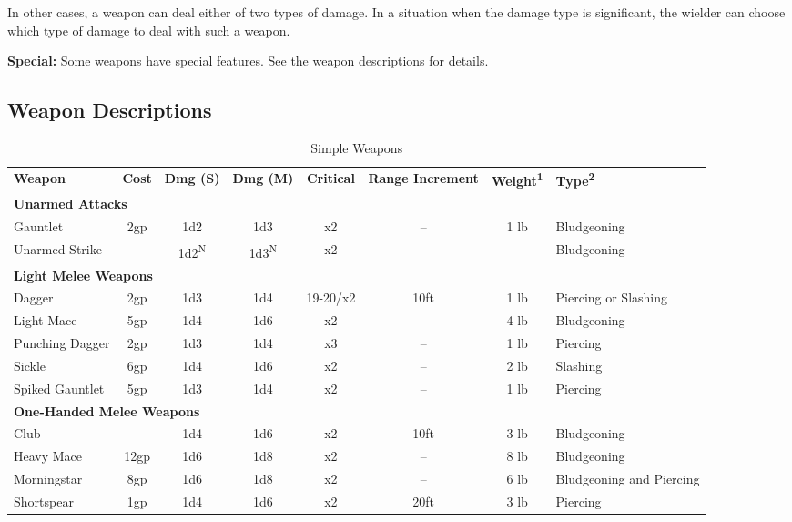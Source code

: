 In other cases, a weapon can deal either of two types of damage. In a situation 
when the damage type is significant, the wielder can choose which type of damage 
to deal with such a weapon.

\textbf{Special:} Some weapons have special features. See the weapon descriptions 
for details.

\subsection{Weapon Descriptions}

\begin{table}[htb]
\mcinherit
\caption{Simple Weapons}
\centering
\begin{tabular}{l c c c c c c p{2cm}}
\textbf{Weapon} & \textbf{Cost} & \textbf{Dmg (S)} & \textbf{Dmg (M)} & \textbf{Critical} & \multicolumn{1}{p{1.7cm}}{\raggedright{}\textbf{Range Increment}} & \textbf{Weight\textsuperscript{1}} & \textbf{Type\textsuperscript{2}}\\

\multicolumn{8}{l}{\textbf{Unarmed Attacks}}\\
\hspace{.5cm}Gauntlet & 2gp & 1d2 & 1d3 & x2 & -- & 1 lb & Bludgeoning\\
\hspace{.5cm}Unarmed Strike & -- & 1d2\textsuperscript{N} & 1d3\textsuperscript{N} & x2 & -- & -- & Bludgeoning\\

\multicolumn{8}{l}{\textbf{Light Melee Weapons}}\\
\hspace{.5cm}Dagger & 2gp & 1d3 & 1d4 & 19-20/x2 & 10ft & 1 lb & Piercing or Slashing\\
\hspace{.5cm}Light Mace & 5gp & 1d4 & 1d6 & x2 & -- & 4 lb & Bludgeoning\\
\hspace{.5cm}Punching Dagger & 2gp & 1d3 & 1d4 & x3 & -- & 1 lb & Piercing\\
\hspace{.5cm}Sickle & 6gp & 1d4 & 1d6 & x2 & -- & 2 lb & Slashing\\
\hspace{.5cm}Spiked Gauntlet & 5gp & 1d3 & 1d4 & x2 & -- & 1 lb & Piercing\\

\multicolumn{8}{l}{\textbf{One-Handed Melee Weapons}}\\
\hspace{.5cm}Club & -- & 1d4 & 1d6 & x2 & 10ft & 3 lb & Bludgeoning\\
\hspace{.5cm}Heavy Mace & 12gp & 1d6 & 1d8 & x2 & -- & 8 lb & Bludgeoning\\
\hspace{.5cm}Morningstar & 8gp & 1d6 & 1d8 & x2 & -- & 6 lb & Bludgeoning and Piercing\\
\hspace{.5cm}Shortspear & 1gp & 1d4 & 1d6 & x2 & 20ft & 3 lb & Piercing\\


\end{tabular}
\end{table}
